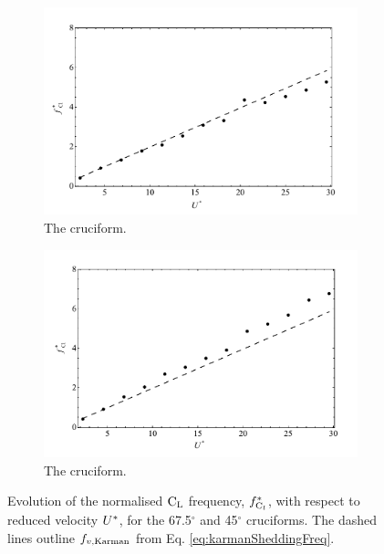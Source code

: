 \documentclass[oneside]{utmthesis}
\begin{document}
\begin{figure}
  \centering
  \begin{subfigure}[h]{1\textwidth}
    \includegraphics[width=\textwidth]{figs/clFreq4}
    \caption{The \angfo{} cruciform.}
    \label{fig:clFreq4}
  \end{subfigure}
 
  \begin{subfigure}[h]{1\textwidth}
    \includegraphics[width=\textwidth]{figs/clFreq3}
    \caption{The \angth{} cruciform.}
    \label{fig:clFreq3}
  \end{subfigure}

  \label{fig:clFreq43}
  \caption{Evolution of the normalised $\text{C}_{\text{L}}$ frequency, $f_{\text{C}_{l}}^{*}$, with respect to reduced velocity $U^{*}$, for the 67.5$^{\circ}$ and 45$^{\circ}$ cruciforms. The dashed lines outline $f_{v,\text{Karman}}$ from Eq. \ref{eq:karmanSheddingFreq}.}
\end{figure}
\end{document}
